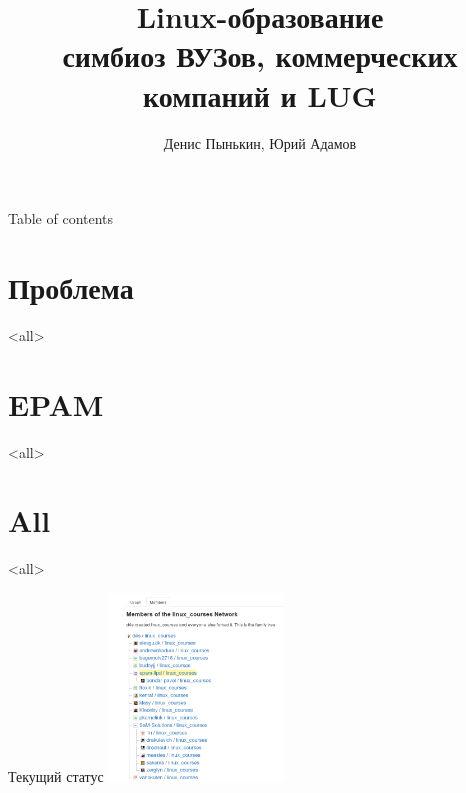 
\graphicspath{{../lvee2013-winter/clipart/}}
\title{Linux-образование \\ симбиоз ВУЗов, коммерческих компаний и LUG}
\author{Денис Пынькин, Юрий Адамов}



\begin{frame}
	\titlepage
\end{frame}

\begin{frame}{Table of contents}
	\tableofcontents
\end{frame}


\section{Проблема}
\mode<all>{}
\section{EPAM}
\mode<all>{}
\section{All}
\mode<all>{}
\begin{frame}{Текущий статус}
  \includegraphics[height=5cm]{network2.png}
\end{frame}

